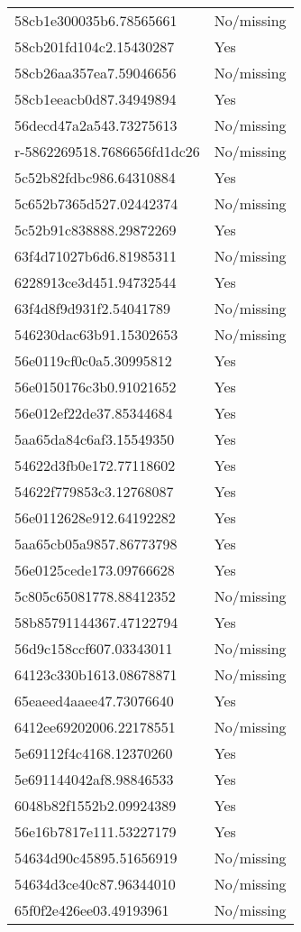 \begin{tabular}{ll}
58cb1e300035b6.78565661 & No/missing \\
58cb201fd104c2.15430287 & Yes \\
58cb26aa357ea7.59046656 & No/missing \\
58cb1eeacb0d87.34949894 & Yes \\
56decd47a2a543.73275613 & No/missing \\
r-5862269518.7686656fd1dc26 & No/missing \\
5c52b82fdbc986.64310884 & Yes \\
5c652b7365d527.02442374 & No/missing \\
5c52b91c838888.29872269 & Yes \\
63f4d71027b6d6.81985311 & No/missing \\
6228913ce3d451.94732544 & Yes \\
63f4d8f9d931f2.54041789 & No/missing \\
546230dac63b91.15302653 & No/missing \\
56e0119cf0c0a5.30995812 & Yes \\
56e0150176c3b0.91021652 & Yes \\
56e012ef22de37.85344684 & Yes \\
5aa65da84c6af3.15549350 & Yes \\
54622d3fb0e172.77118602 & Yes \\
54622f779853c3.12768087 & Yes \\
56e0112628e912.64192282 & Yes \\
5aa65cb05a9857.86773798 & Yes \\
56e0125cede173.09766628 & Yes \\
5c805c65081778.88412352 & No/missing \\
58b85791144367.47122794 & Yes \\
56d9c158ccf607.03343011 & No/missing \\
64123c330b1613.08678871 & No/missing \\
65eaeed4aaee47.73076640 & Yes \\
6412ee69202006.22178551 & No/missing \\
5e69112f4c4168.12370260 & Yes \\
5e691144042af8.98846533 & Yes \\
6048b82f1552b2.09924389 & Yes \\
56e16b7817e111.53227179 & Yes \\
54634d90c45895.51656919 & No/missing \\
54634d3ce40c87.96344010 & No/missing \\
65f0f2e426ee03.49193961 & No/missing \\

\end{tabular}
